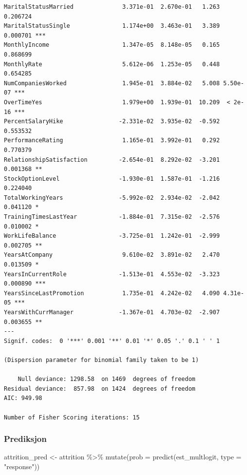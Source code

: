 \documentclass[
  letterpaper,
  DIV=11,
  numbers=noendperiod]{scrreprt}
\newenvironment{Shaded}{\begin{snugshade}}{\end{snugshade}}
\newcommand{\AttributeTok}[1]{\textcolor[rgb]{0.40,0.45,0.13}{#1}}
\newcommand{\FunctionTok}[1]{\textcolor[rgb]{0.28,0.35,0.67}{#1}}
\newcommand{\NormalTok}[1]{\textcolor[rgb]{0.00,0.23,0.31}{#1}}
\newcommand{\OtherTok}[1]{\textcolor[rgb]{0.00,0.23,0.31}{#1}}
\newcommand{\SpecialCharTok}[1]{\textcolor[rgb]{0.37,0.37,0.37}{#1}}
\newcommand{\StringTok}[1]{\textcolor[rgb]{0.13,0.47,0.30}{#1}}
\theoremstyle{definition}
\theoremstyle{remark}
\begin{document}
\begin{verbatim}
MaritalStatusMarried              3.371e-01  2.670e-01   1.263 0.206724    
MaritalStatusSingle               1.174e+00  3.463e-01   3.389 0.000701 ***
MonthlyIncome                     1.347e-05  8.148e-05   0.165 0.868699    
MonthlyRate                       5.612e-06  1.253e-05   0.448 0.654285    
NumCompaniesWorked                1.945e-01  3.884e-02   5.008 5.50e-07 ***
OverTimeYes                       1.979e+00  1.939e-01  10.209  < 2e-16 ***
PercentSalaryHike                -2.331e-02  3.935e-02  -0.592 0.553532    
PerformanceRating                 1.165e-01  3.992e-01   0.292 0.770379    
RelationshipSatisfaction         -2.654e-01  8.292e-02  -3.201 0.001368 ** 
StockOptionLevel                 -1.930e-01  1.587e-01  -1.216 0.224040    
TotalWorkingYears                -5.992e-02  2.934e-02  -2.042 0.041120 *  
TrainingTimesLastYear            -1.884e-01  7.315e-02  -2.576 0.010002 *  
WorkLifeBalance                  -3.725e-01  1.242e-01  -2.999 0.002705 ** 
YearsAtCompany                    9.610e-02  3.891e-02   2.470 0.013509 *  
YearsInCurrentRole               -1.513e-01  4.553e-02  -3.323 0.000890 ***
YearsSinceLastPromotion           1.735e-01  4.242e-02   4.090 4.31e-05 ***
YearsWithCurrManager             -1.367e-01  4.703e-02  -2.907 0.003655 ** 
---
Signif. codes:  0 '***' 0.001 '**' 0.01 '*' 0.05 '.' 0.1 ' ' 1

(Dispersion parameter for binomial family taken to be 1)

    Null deviance: 1298.58  on 1469  degrees of freedom
Residual deviance:  857.98  on 1424  degrees of freedom
AIC: 949.98

Number of Fisher Scoring iterations: 15
\end{verbatim}

\hypertarget{prediksjon-1}{%
\subsubsection{Prediksjon}\label{prediksjon-1}}

\begin{Shaded}
\begin{Highlighting}[]
\NormalTok{attrition\_pred }\OtherTok{\textless{}{-}}\NormalTok{ attrition }\SpecialCharTok{\%\textgreater{}\%} 
  \FunctionTok{mutate}\NormalTok{(}\AttributeTok{prob =} \FunctionTok{predict}\NormalTok{(est\_multlogit, }\AttributeTok{type =} \StringTok{"response"}\NormalTok{)) }
\end{Highlighting}
\end{Shaded}
\end{document}
